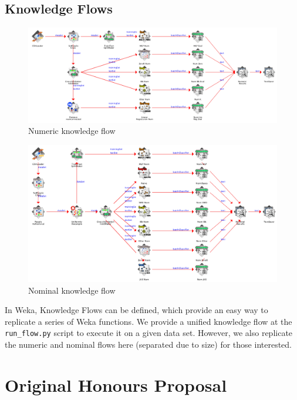 \begin{landscape}
\chapter{Knowledge Flows}
\label{chap:knowledgeflows}

\begin{figure}[H]
\centering
\includegraphics[width=\linewidth]{../diagrams/knowledgeflow-numeric.png}
\caption{Numeric knowledge flow}
\end{figure}
\end{landscape}

\begin{landscape}
\begin{figure}[H]
\centering
\includegraphics[width=\linewidth]{../diagrams/knowledgeflow-nominal.png}
\caption{Nominal knowledge flow}
\end{figure}

In Weka, Knowledge Flows can be defined, which provide an easy way to replicate a series of Weka functions. We provide a unified knowledge flow at the \texttt{run\_flow.py} script to execute it on a given data set. However, we also replicate the numeric and nominal flows here (separated due to size) for those interested.
\end{landscape}

\chapter{Original Honours Proposal}
